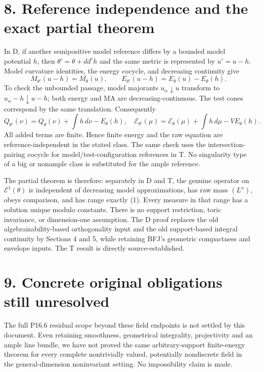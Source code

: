 \documentclass[11pt]{article}
\begin{document}
\section*{8. Reference independence and the exact partial theorem}

In D, if another semipositive model reference differs by a bounded model potential \(h\), then \(\theta'=\theta+dd^ch\) and the same metric is represented by \(u'=u-h\). Model curvature identities, the energy cocycle, and decreasing continuity give
\[
 M_{\theta'}(u-h)=M_\theta(u),\qquad
 E_{\theta'}(u-h)=E_\theta(u)-E_\theta(h).
 \tag{18}
\]
To check the unbounded passage, model majorants \(u_\alpha\downarrow u\) transform to \(u_\alpha-h\downarrow u-h\); both energy and MA are decreasing-continuous. The test cones correspond by the same translation. Consequently
\[
 Q_{\theta'}(\nu)=Q_\theta(\nu)+\int h\,d\nu-E_\theta(h),
 \quad
 \mathscr E_{\theta'}(\mu)=\mathscr E_\theta(\mu)+\int h\,d\mu-VE_\theta(h).
 \tag{19}
\]
All added terms are finite. Hence finite energy and the raw equation are reference-independent in the stated class. The same check uses the intersection-pairing cocycle for model/test-configuration references in T. No singularity type of a big or nonample class is substituted for the ample reference.

The partial theorem is therefore: separately in D and T, the genuine operator on \(\mathcal E^1(\theta)\) is independent of decreasing model approximations, has raw mass \((L^n)\), obeys comparison, and has range exactly (1). Every measure in that range has a solution unique modulo constants. There is no support restriction, toric invariance, or dimension-one assumption. The D proof replaces the old algebraizability-based orthogonality input and the old support-based integral continuity by Sections 4 and 5, while retaining BFJ's geometric compactness and envelope inputs. The T result is directly source-established.

\section*{9. Concrete original obligations still unresolved}

The full P16.6 residual scope beyond these field endpoints is not settled by this document. Even retaining smoothness, geometrical integrality, projectivity and an ample line bundle, we have not proved the same arbitrary-support finite-energy theorem for every complete nontrivially valued, potentially nondiscrete field in the general-dimension noninvariant setting. No impossibility claim is made.
\end{document}

